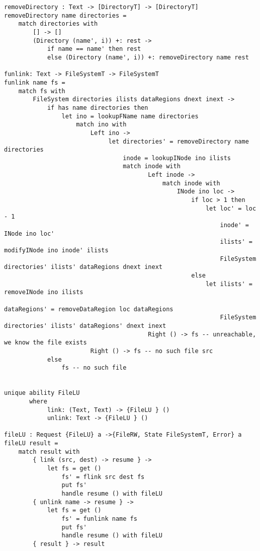\documentclass[logo,bsc,singlespacing,parskip]{infthesis}
\begin{document}
\begin{lstlisting}[language=unison]
removeDirectory : Text -> [DirectoryT] -> [DirectoryT]
removeDirectory name directories =
    match directories with
        [] -> []
        (Directory (name', i)) +: rest ->
            if name == name' then rest
            else (Directory (name', i)) +: removeDirectory name rest

funlink: Text -> FileSystemT -> FileSystemT
funlink name fs =
    match fs with
        FileSystem directories ilists dataRegions dnext inext ->
            if has name directories then
                let ino = lookupFName name directories
                    match ino with
                        Left ino ->
                             let directories' = removeDirectory name directories
                                 inode = lookupINode ino ilists
                                 match inode with
                                        Left inode ->
                                            match inode with
                                                INode ino loc ->
                                                    if loc > 1 then
                                                        let loc' = loc - 1
                                                            inode' = INode ino loc'
                                                            ilists' = modifyINode ino inode' ilists
                                                            FileSystem directories' ilists' dataRegions dnext inext
                                                    else
                                                        let ilists' = removeINode ino ilists
                                                            dataRegions' = removeDataRegion loc dataRegions
                                                            FileSystem directories' ilists' dataRegions' dnext inext
                                        Right () -> fs -- unreachable, we know the file exists
                        Right () -> fs -- no such file src
            else
                fs -- no such file


unique ability FileLU
       where
            link: (Text, Text) -> {FileLU } ()
            unlink: Text -> {FileLU } ()

fileLU : Request {FileLU} a ->{FileRW, State FileSystemT, Error} a
fileLU result =
    match result with
        { link (src, dest) -> resume } ->
            let fs = get ()
                fs' = flink src dest fs
                put fs'
                handle resume () with fileLU
        { unlink name -> resume } ->
            let fs = get ()
                fs' = funlink name fs
                put fs'
                handle resume () with fileLU
        { result } -> result


\end{lstlisting}
\end{document}

